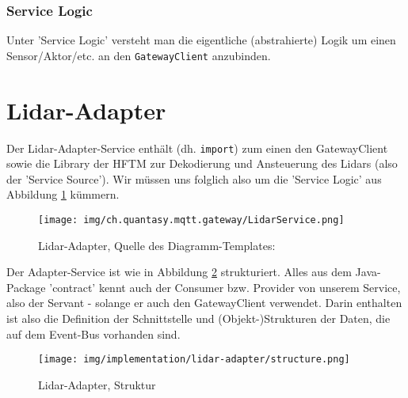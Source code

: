\subsubsection{Service Logic}
Unter 'Service Logic' versteht man die eigentliche (abstrahierte) Logik um einen Sensor/Aktor/etc. an den \verb|GatewayClient| anzubinden.


\section{Lidar-Adapter}
Der Lidar-Adapter-Service enthält (dh. \verb|import|) zum einen den GatewayClient sowie die Library der HFTM zur Dekodierung und Ansteuerung des Lidars (also der 'Service Source'). Wir müssen uns folglich also um die 'Service Logic' aus Abbildung \ref{fig:lidarservice} kümmern.
\begin{figure}[H]
	\centering
	\texttt{[image: img/ch.quantasy.mqtt.gateway/LidarService.png]}
	\caption{Lidar-Adapter, Quelle des Diagramm-Templates: \cite{ch.quantasy.mqtt.gateway}}
	\label{fig:lidarservice}
\end{figure}

Der Adapter-Service ist wie in Abbildung \ref{fig:structure_lidarservice} strukturiert. Alles aus dem Java-Package 'contract' kennt auch der Consumer bzw. Provider von unserem Service, also der Servant - solange er auch den GatewayClient verwendet. Darin enthalten ist also die Definition der Schnittstelle und (Objekt-)Strukturen der Daten, die auf dem Event-Bus vorhanden sind.
\begin{figure}[H]
	\centering
	\texttt{[image: img/implementation/lidar-adapter/structure.png]}
	\caption{Lidar-Adapter, Struktur}
	\label{fig:structure_lidarservice}
\end{figure}

